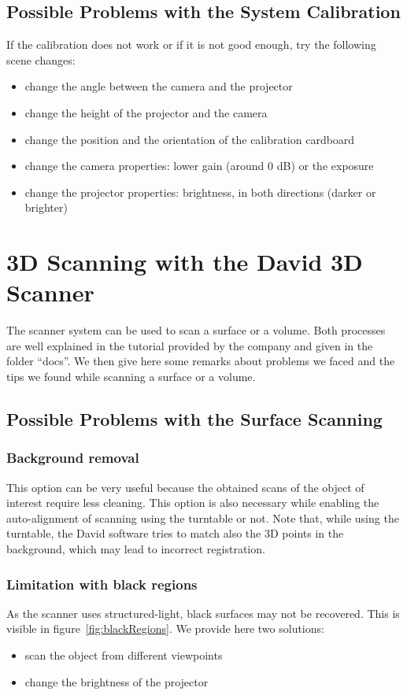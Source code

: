 \documentclass[11pt]{article}
\begin{document}
\subsection{Possible Problems with the System Calibration}
If the calibration does not work or if it is not good enough, try the following scene changes:
\begin{itemize}
\item change the angle between the camera and the projector
\item change the height of the projector and the camera
\item change the position and the orientation of the calibration cardboard
\item change the camera properties: lower gain (around 0 dB) or the exposure
\item change the projector properties: brightness, in both directions (darker or brighter)
\end{itemize}

\section{3D Scanning with the David 3D Scanner}
The scanner system can be used to scan a surface or a volume.
Both processes are well explained in the tutorial provided by the company and given in the folder ``docs''.
We then give here some remarks about problems we faced and the tips we found while scanning a surface or a volume.

\subsection{Possible Problems with the Surface Scanning}
\subsubsection{Background removal}
This option can be very useful because the obtained scans of the object of interest require less cleaning.
This option is also necessary while enabling the auto-alignment of scanning using the turntable or not.
Note that, while using the turntable, the David software tries to match also the 3D points in the background, which may lead to incorrect registration.

\subsubsection{Limitation with black regions}
As the scanner uses structured-light, black surfaces may not be recovered.
This is visible in figure~\ref{fig:blackRegions}.
We provide here two solutions:
\begin{itemize}
\item scan the object from different viewpoints
\item change the brightness of the projector
\end{itemize}
\end{document}
